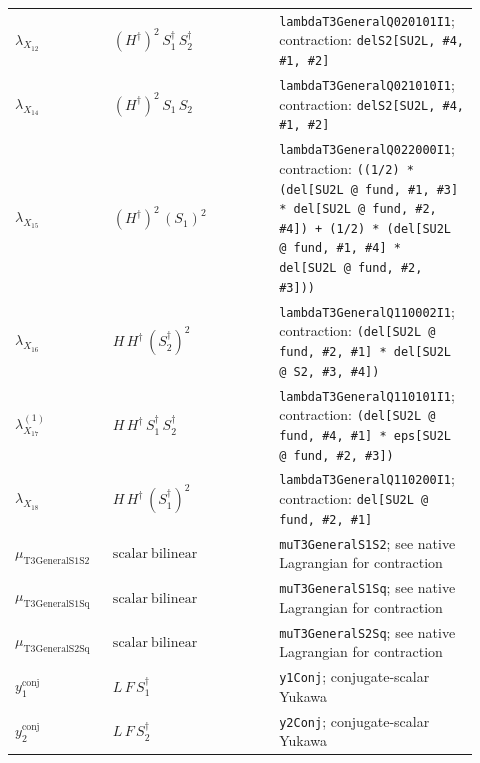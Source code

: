 \documentclass[9pt]{article}
\begin{document}
\begin{longtable}{@{}p{0.20\linewidth}p{0.34\linewidth}p{0.38\linewidth}@{}}
$\lambda_{X_{12}}$ & $(H^\dagger)^{2}\,S_1^\dagger\,S_2^\dagger$ & \texttt{lambdaT3GeneralQ020101I1}; contraction: \texttt{delS2[SU2L, \#4, \#1, \#2]} \\
$\lambda_{X_{14}}$ & $(H^\dagger)^{2}\,S_1\,S_2$ & \texttt{lambdaT3GeneralQ021010I1}; contraction: \texttt{delS2[SU2L, \#4, \#1, \#2]} \\
$\lambda_{X_{15}}$ & $(H^\dagger)^{2}\,(S_1)^{2}$ & \texttt{lambdaT3GeneralQ022000I1}; contraction: \texttt{((1/2) * (del[SU2L @ fund, \#1, \#3] * del[SU2L @ fund, \#2, \#4]) + (1/2) * (del[SU2L @ fund, \#1, \#4] * del[SU2L @ fund, \#2, \#3]))} \\
$\lambda_{X_{16}}$ & $H\,H^\dagger\,(S_2^\dagger)^{2}$ & \texttt{lambdaT3GeneralQ110002I1}; contraction: \texttt{(del[SU2L @ fund, \#2, \#1] * del[SU2L @ S2, \#3, \#4])} \\
$\lambda_{X_{17}}^{(1)}$ & $H\,H^\dagger\,S_1^\dagger\,S_2^\dagger$ & \texttt{lambdaT3GeneralQ110101I1}; contraction: \texttt{(del[SU2L @ fund, \#4, \#1] * eps[SU2L @ fund, \#2, \#3])} \\
$\lambda_{X_{18}}$ & $H\,H^\dagger\,(S_1^\dagger)^{2}$ & \texttt{lambdaT3GeneralQ110200I1}; contraction: \texttt{del[SU2L @ fund, \#2, \#1]} \\
$\mu_{\mathrm{T3GeneralS1S2}}$ & $\mathrm{scalar\ bilinear}$ & \texttt{muT3GeneralS1S2}; see native Lagrangian for contraction \\
$\mu_{\mathrm{T3GeneralS1Sq}}$ & $\mathrm{scalar\ bilinear}$ & \texttt{muT3GeneralS1Sq}; see native Lagrangian for contraction \\
$\mu_{\mathrm{T3GeneralS2Sq}}$ & $\mathrm{scalar\ bilinear}$ & \texttt{muT3GeneralS2Sq}; see native Lagrangian for contraction \\
$y_{1}^{\mathrm{conj}}$ & $L\,F\,S_1^\dagger$ & \texttt{y1Conj}; conjugate-scalar Yukawa \\
$y_{2}^{\mathrm{conj}}$ & $L\,F\,S_2^\dagger$ & \texttt{y2Conj}; conjugate-scalar Yukawa \\
\bottomrule
\end{longtable}
\end{document}
